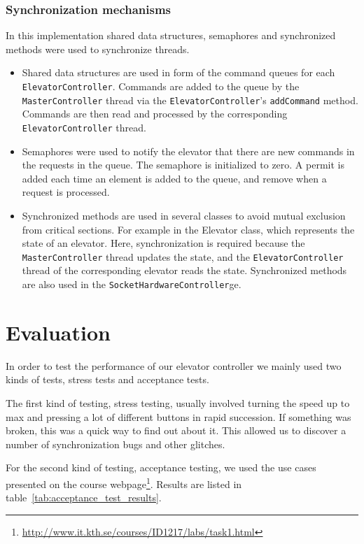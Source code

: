 \documentclass[a4paper]{article}
\begin{document}
\subsubsection{Synchronization mechanisms}
In this implementation shared data structures, semaphores and synchronized methods were used to synchronize threads.
\begin{itemize}
\item Shared data structures are used in form of the command queues for each \texttt{ElevatorController}. Commands are added to the queue by the \texttt{MasterController} thread via the \texttt{ElevatorController}'s \texttt{addCommand} method. Commands are then read and processed by the corresponding \texttt{ElevatorController} thread.
\item Semaphores were used to notify the elevator that there are new commands in the requests in the queue. The semaphore is initialized to zero. A permit is added each time an element is added to the queue, and remove when a request is processed.
\item Synchronized methods are used in several classes to avoid mutual exclusion from critical sections. For example in the Elevator class, which represents the state of an elevator. Here, synchronization is required because the \texttt{MasterController} thread updates the state, and the \texttt{ElevatorController} thread of the corresponding elevator reads the state. Synchronized methods are also used in the \texttt{SocketHardwareController}ge.
\end{itemize}

\section{Evaluation}

In order to test the performance of our elevator controller we mainly used two
kinds of tests, stress tests and acceptance tests.

The first kind of testing, stress testing, usually involved turning the speed up
to max and pressing a lot of different buttons in rapid succession. If something
was broken, this was a quick way to find out about it. This allowed us to
discover a number of synchronization bugs and other glitches.

For the second kind of testing, acceptance testing, we used the use cases
presented on the course
webpage\footnote{\url{http://www.it.kth.se/courses/ID1217/labs/task1.html}}.
Results are listed in table~\ref{tab:acceptance_test_results}.
\end{document}

